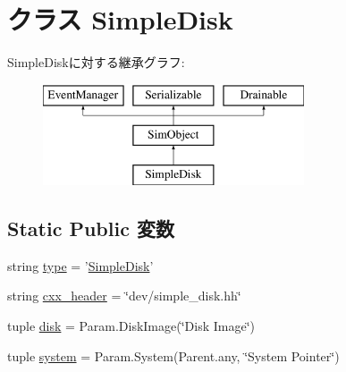 \hypertarget{classSimpleDisk_1_1SimpleDisk}{
\section{クラス SimpleDisk}
\label{classSimpleDisk_1_1SimpleDisk}
}
SimpleDiskに対する継承グラフ:\begin{figure}[H]
\begin{center}
\leavevmode
\includegraphics[height=3cm]{classSimpleDisk_1_1SimpleDisk}
\end{center}
\end{figure}
\subsection*{Static Public 変数}
\begin{DoxyCompactItemize}
\item 
string \hyperlink{classSimpleDisk_1_1SimpleDisk_acce15679d830831b0bbe8ebc2a60b2ca}{type} = '\hyperlink{classSimpleDisk_1_1SimpleDisk}{SimpleDisk}'
\item 
string \hyperlink{classSimpleDisk_1_1SimpleDisk_a17da7064bc5c518791f0c891eff05fda}{cxx\_\-header} = \char`\"{}dev/simple\_\-disk.hh\char`\"{}
\item 
tuple \hyperlink{classSimpleDisk_1_1SimpleDisk_a2cb8a7cfa320c243ad28a4ba142879c4}{disk} = Param.DiskImage(\char`\"{}Disk Image\char`\"{})
\item 
tuple \hyperlink{classSimpleDisk_1_1SimpleDisk_ab737471139f5a296e5b26e8a0e1b0744}{system} = Param.System(Parent.any, \char`\"{}System Pointer\char`\"{})
\end{DoxyCompactItemize}


